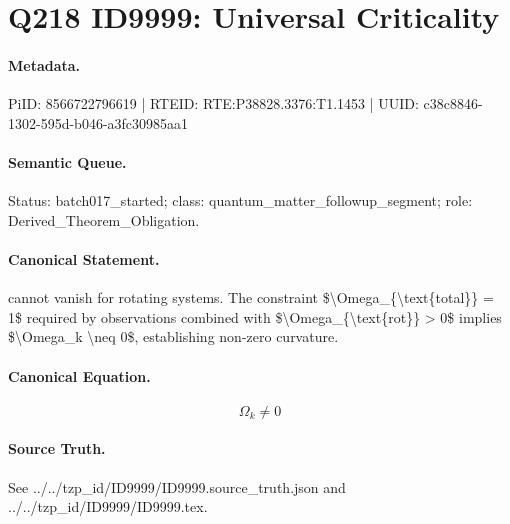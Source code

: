 \section*{Q218 ID9999: Universal Criticality}
\paragraph{Metadata.}
PiID: 8566722796619 | RTEID: RTE:P38828.3376:T1.1453 | UUID: c38c8846-1302-595d-b046-a3fc30985aa1

\paragraph{Semantic Queue.}
Status: batch017\_started; class: quantum\_matter\_followup\_segment; role: Derived\_Theorem\_Obligation.

\paragraph{Canonical Statement.}
cannot vanish for rotating systems. The constraint \$\textbackslash{}Omega\_\{\textbackslash{}text\{total\}\} = 1\$ required by observations combined with \$\textbackslash{}Omega\_\{\textbackslash{}text\{rot\}\} > 0\$ implies \$\textbackslash{}Omega\_k \textbackslash{}neq 0\$, establishing non-zero curvature.

\paragraph{Canonical Equation.}
\[
\Omega_k \neq 0
\]

\paragraph{Source Truth.}
See ../../tzp\_id/ID9999/ID9999.source\_truth.json and ../../tzp\_id/ID9999/ID9999.tex.
